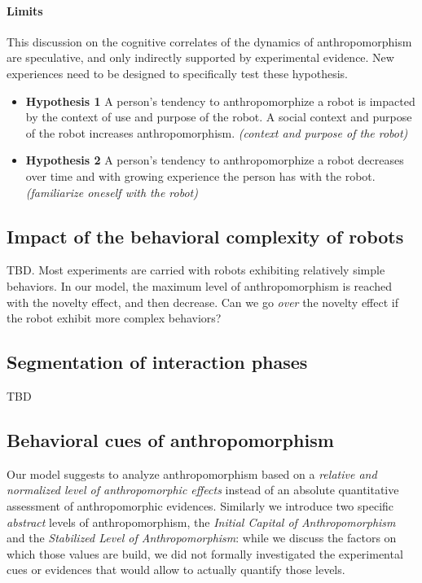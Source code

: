 \documentclass{frontiersSCNS} %
\begin{document}
\paragraph{Limits} This discussion on the cognitive correlates of the dynamics
of anthropomorphism are speculative, and only indirectly supported by
experimental evidence. New experiences need to be designed to specifically test
these hypothesis.


\begin{itemize}
    \item \textbf{Hypothesis 1} A person's tendency to anthropomorphize a robot
        is impacted by the context of use and purpose of the robot. A social
        context and purpose of the robot increases anthropomorphism.
        \textit{(context and purpose of the robot)}
	\item \textbf{Hypothesis 2} A person's tendency to anthropomorphize a robot decreases over time and with growing experience the person has with the robot. \textit{(familiarize oneself with the robot)}
\end{itemize}

\subsection*{Impact of the behavioral complexity of robots}

TBD. Most experiments are carried with robots exhibiting relatively simple
behaviors. In our model, the maximum level of anthropomorphism is reached with
the novelty effect, and then decrease. Can we go \emph{over} the novelty effect
if the robot exhibit more complex behaviors?

\subsection*{Segmentation of interaction phases}

TBD

\subsection*{Behavioral cues of anthropomorphism}
\label{sec:behavioralcues}

Our model suggests to analyze anthropomorphism based on a \emph{relative and
normalized level of anthropomorphic effects} instead of an absolute
quantitative assessment of anthropomorphic evidences. Similarly we introduce
two specific \emph{abstract} levels of anthropomorphism, the \emph{Initial
Capital of Anthropomorphism} and the \emph{Stabilized Level of
Anthropomorphism}: while we discuss the factors on which those values are
build, we did not formally investigated the experimental cues or evidences
that would allow to actually quantify those levels.
\end{document}
